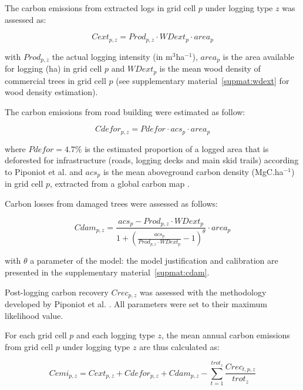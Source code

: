 \documentclass{article}
\begin{document}
The carbon emissions from extracted logs in grid cell $p$ under logging type $z$ was assessed as: 

\begin{equation}
\label{eq:cext}
    Cext_{p,z} = Prod_{p,z} \cdot WDext_p \cdot  area_p
\end{equation}

with $Prod_{p,z}$ the actual logging intensity (in m$^3$ha$^{-1}$), $area_p$ is the area available for logging (ha) in grid cell $p$ and $WDext_p$ is the mean wood density of commercial trees in grid cell $p$ (see supplementary material~\ref{supmat:wdext} for wood density estimation). 

The carbon emissions from road building were estimated as follow: 

\begin{equation}
\label{eq:croad}
    Cdefor_{p,z} = Pdefor \cdot acs_p \cdot area_p
\end{equation}

where $Pdefor = 4.7 $\% is the estimated proportion of a logged area that is deforested for infrastructure (roads, logging decks and main skid trails) according to Piponiot et al. \cite{Piponiot2016} and $acs_p$ is the mean aboveground carbon density (MgC.ha$^{-1}$) in grid cell $p$, extracted from a global carbon map \cite{Avitabile2016}. 

Carbon losses from damaged trees were assessed as follows: 

\begin{equation}
\label{eq:cdam}
    Cdam_{p,z} = \frac{acs_p  - Prod_{p,z} \cdot WDext_p } {1 + \left(\frac{acs_p}{Prod_{p,z} \cdot WDext_p}  -1 \right)^\theta} \cdot area_p
\end{equation}

with $\theta$ a parameter of the model: the model justification and calibration are presented in the supplementary material~\ref{supmat:cdam}. 

Post-logging carbon recovery $Crec_{p,z}$ was assessed with the methodology developed by Piponiot et al. \cite{Piponiot2016a}.  
All parameters were set to their maximum likelihood value. 

For each grid cell $p$ and each logging type $z$, the mean annual carbon emissions from grid cell $p$ under logging type $z$ are thus calculated as: 

\begin{equation}
\label{eq:cemi}
    Cemi_{p,z} = Cext_{p,z} + Cdefor_{p,z} + Cdam_{p,z} -  \sum_{t=1}^{trot_z} \frac{Crec_{t,p,z}}{trot_z} 
\end{equation}
\end{document}
